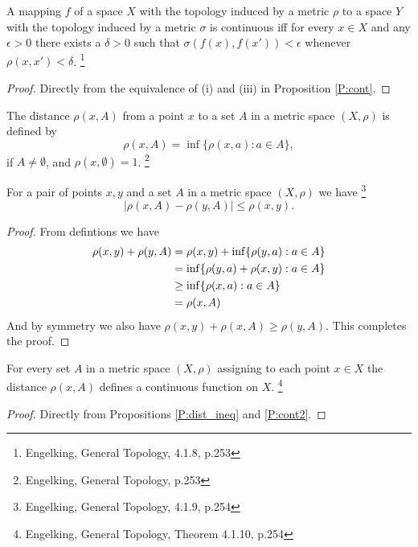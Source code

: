 \begin{proposition} \label{P:cont2}
A mapping $f$ of a space $X$ with the topology induced by a metric $\rho$ to a
space $Y$ with the topology induced by a metric $\sigma$ is continuous iff for
every $x\in X$ and any $\epsilon>0$ there exists a $\delta>0$ such that 
$\sigma(f(x),f(x'))<\epsilon$ whenever $\rho(x,x')<\delta$.
\footnote{Engelking, General Topology, 4.1.8, p.253}
\end{proposition}
\begin{proof}
Directly from the equivalence of (i) and (iii) in Proposition \ref{P:cont}.
\end{proof}


\begin{definition}
The distance $\rho(x,A)$ from a point $x$ to a set $A$ in a metric space
$(X,\rho)$ is defined by
\[
  \rho(x,A)=\inf\{\rho(x,a): a\in A\}, 
\]
if $A\neq \emptyset$, and $\rho(x,\emptyset)=1$.
\footnote{Engelking, General Topology, p.253}
\end{definition}


\begin{proposition} \label{P:dist_ineq}
For a pair of points $x,y$ and a set $A$ in a metric space $(X,\rho)$ we have
\footnote{Engelking, General Topology, 4.1.9, p.254}
\[
  |\rho(x,A)-\rho(y,A)|\le \rho(x,y).
\]
\end{proposition}
\begin{proof}
From defintions we have
\begin{align*}
  \rho(x,y) + \rho(y,A) 
    &= \rho(x,y) + \inf\{\rho(y,a): a\in A\}  \notag \\
    &= \inf\{\rho(y,a)+\rho(x,y): a\in A\}  \notag \\
    &\ge \inf\{\rho(x,a): a\in A\}  \notag \\
    &= \rho(x,A) \notag \\
\end{align*}
And by symmetry we also have $\rho(x,y) + \rho(x,A)\ge\rho(y,A)$. 
This completes the proof.
\end{proof}

\begin{theorem} \label{T:dist_cont}
For every set $A$ in a metric space $(X,\rho)$ assigning to each point $x\in X$
the distance $\rho(x,A)$ defines a continuous function on $X$.
\footnote{Engelking, General Topology, Theorem 4.1.10, p.254}
\end{theorem}
\begin{proof}
Directly from Propositions \ref{P:dist_ineq} and \ref{P:cont2}.
\end{proof}


